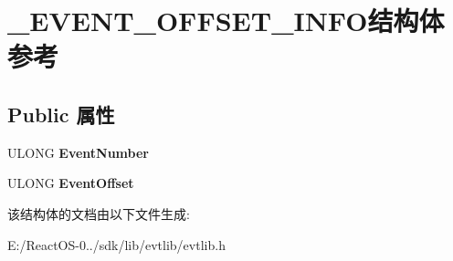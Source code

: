 \hypertarget{struct___e_v_e_n_t___o_f_f_s_e_t___i_n_f_o}{}\section{\+\_\+\+E\+V\+E\+N\+T\+\_\+\+O\+F\+F\+S\+E\+T\+\_\+\+I\+N\+F\+O结构体 参考}
\label{struct___e_v_e_n_t___o_f_f_s_e_t___i_n_f_o}
\subsection*{Public 属性}
\begin{DoxyCompactItemize}
\item 
\mbox{\label{struct___e_v_e_n_t___o_f_f_s_e_t___i_n_f_o_a926753a137babbac75e4fc02a90682a5}} 
U\+L\+O\+NG {\bfseries Event\+Number}
\item 
\mbox{\label{struct___e_v_e_n_t___o_f_f_s_e_t___i_n_f_o_a6f18d9f46cef695baeaf4b82f1754547}} 
U\+L\+O\+NG {\bfseries Event\+Offset}
\end{DoxyCompactItemize}


该结构体的文档由以下文件生成\+:\begin{DoxyCompactItemize}
\item 
E\+:/\+React\+O\+S-\/0../sdk/lib/evtlib/evtlib.\+h\end{DoxyCompactItemize}
